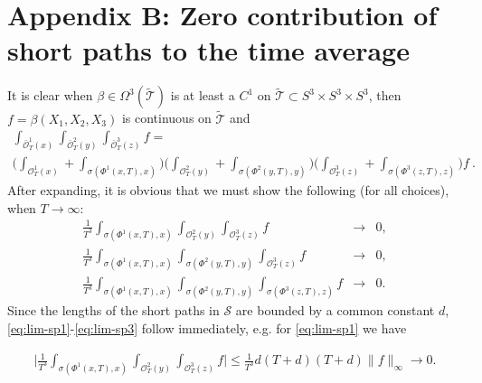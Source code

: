 \documentclass[12pt]{article}
\begin{document}
\section*{Appendix B: Zero contribution of short paths to the time average}

It is clear when $\beta\in \Omega^3(\widetilde{\mathcal{T}})$ is at least a $C^1$ on
$\widetilde{\mathcal{T}}\subset S^3\times S^3\times S^3$, then
$f=\beta(X_1,X_2,X_3)$ is continuous on $\widetilde{\mathcal{T}}$ and
\begin{gather*}
\int_{\bar{\mathscr{O}}^1_T(x)}\int_{\bar{\mathscr{O}}^2_T(y)}\int_{\bar{\mathscr{O}}^3_T(z)}
f=\\
\bigl(\int_{\mathscr{O}^1_T(x)}+\int_{\sigma(\Phi^1(x,T),x)}\bigr)
\bigl(\int_{\mathscr{O}^2_T(y)}+\int_{\sigma(\Phi^2(y,T),y)}\bigr)
\bigl(\int_{\mathscr{O}^3_T(z)}+\int_{\sigma(\Phi^3(z,T),z)}\bigr)f\ .
\end{gather*}
After expanding, it is obvious that we must show the following (for all choices), when $T\to \infty$:
\begin{eqnarray}\label{eq:lim-sp1}
\frac{1}{T^3}\int_{\sigma(\Phi^1(x,T),x)}\int_{\mathscr{O}^2_{T}(y)}\int_{\mathscr{O}^3_{T}(z)} f & \longrightarrow & 0,\\
\label{eq:lim-sp2}\frac{1}{T^3}\int_{\sigma(\Phi^1(x,T),x)}\int_{\sigma(\Phi^2(y,T),y)}\int_{\mathscr{O}^3_{T}(z)} f & \longrightarrow & 0,\\
\label{eq:lim-sp3}\frac{1}{T^3}\int_{\sigma(\Phi^1(x,T),x)}\int_{\sigma(\Phi^2(y,T),y)}\int_{\sigma(\Phi^3(z,T),z)} f & \longrightarrow & 0.
\end{eqnarray}
Since the lengths of the short paths in $\mathcal{S}$ are bounded by a common constant $d$, \eqref{eq:lim-sp1}-\eqref{eq:lim-sp3} follow immediately, e.g. for \eqref{eq:lim-sp1} we have

\begin{gather*}
\bigl|\frac{1}{T^3}\int_{\sigma(\Phi^1(x,T),x)}\int_{\mathscr{O}^2_{T}(y)}\int_{\mathscr{O}^3_{T}(z)} f\bigr|\leq \frac{1}{T^3} d(T+d)(T+d)\|f\|_{\infty} \longrightarrow  0.
\end{gather*} 
\end{document}
